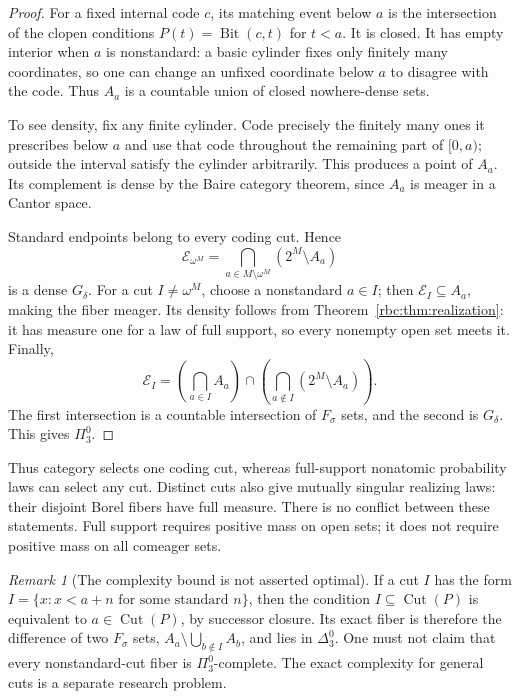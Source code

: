 \documentclass[11pt]{article}
\numberwithin{equation}{section}
\theoremstyle{definition}
\theoremstyle{remark}
\newtheorem{remark}[theorem]{Remark}
\newcommand{\std}{\omega^M}
\newcommand{\Bit}{\operatorname{Bit}}
\newcommand{\Cut}{\operatorname{Cut}}
\begin{document}
\begin{proof}
For a fixed internal code $c$, its matching event below $a$ is the
intersection of the clopen conditions
$P(t)=\Bit(c,t)$ for $t<a$. It is closed. It has empty interior when $a$
is nonstandard: a basic cylinder fixes only finitely many coordinates, so
one can change an unfixed coordinate below $a$ to disagree with the code.
Thus $A_a$ is a countable union of closed nowhere-dense sets.

To see density, fix any finite cylinder. Code precisely the finitely many
ones it prescribes below $a$ and use that code throughout the remaining
part of $[0,a)$; outside the interval satisfy the cylinder arbitrarily.
This produces a point of $A_a$. Its complement is dense by the Baire
category theorem, since $A_a$ is meager in a Cantor space.

Standard endpoints belong to every coding cut. Hence
\[
 \mathcal E_{\std}
   =\bigcap_{a\in M\setminus\std}(2^M\setminus A_a)
\]
is a dense $G_\delta$. For a cut $I\ne\std$, choose a nonstandard $a\in I$;
then $\mathcal E_I\subseteq A_a$, making the fiber meager. Its density
follows from Theorem~\ref{rbc:thm:realization}: it has measure one for a law of
full support, so every nonempty open set meets it. Finally,
\begin{equation}
 \mathcal E_I=
   \left(\bigcap_{a\in I}A_a\right)
   \cap
   \left(\bigcap_{a\notin I}(2^M\setminus A_a)\right).
\label{rbc:eq:fiber-borel}
\end{equation}
The first intersection is a countable intersection of $F_\sigma$ sets,
and the second is $G_\delta$. This gives $\Pi^0_3$.
\end{proof}

Thus category selects one coding cut, whereas full-support nonatomic
probability laws can select any cut. Distinct cuts also give mutually
singular realizing laws: their disjoint Borel fibers have full measure.
There is no conflict between these statements. Full support requires
positive mass on open sets; it does not require positive mass on all
comeager sets.

\begin{remark}[The complexity bound is not asserted optimal]
If a cut $I$ has the form
$I=\{x:x<a+n\text{ for some standard }n\}$, then the condition
$I\subseteq\Cut(P)$ is equivalent to $a\in\Cut(P)$, by successor closure.
Its exact fiber is therefore the difference of two $F_\sigma$ sets,
$A_a\setminus\bigcup_{b\notin I}A_b$, and lies in $\Delta^0_3$.
One must not claim that every nonstandard-cut fiber is $\Pi^0_3$-complete.
The exact complexity for general cuts is a separate research problem.
\end{remark}
\end{document}
